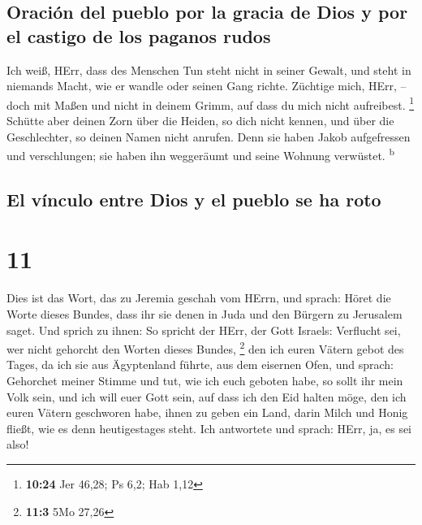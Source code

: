 \hypertarget{oraciuxf3n-del-pueblo-por-la-gracia-de-dios-y-por-el-castigo-de-los-paganos-rudos}{%
\subsection{Oración del pueblo por la gracia de Dios y por el castigo de
los paganos
rudos}\label{oraciuxf3n-del-pueblo-por-la-gracia-de-dios-y-por-el-castigo-de-los-paganos-rudos}}

 Ich weiß, HErr, dass des Menschen Tun steht nicht in
seiner Gewalt, und steht in niemands Macht, wie er wandle oder seinen
Gang richte.  Züchtige mich, HErr, -- doch mit Maßen und
nicht in deinem Grimm, auf dass du mich nicht aufreibest. \footnote{\textbf{10:24}
  Jer 46,28; Ps 6,2; Hab 1,12}  Schütte aber deinen Zorn
über die Heiden, so dich nicht kennen, und über die Geschlechter, so
deinen Namen nicht anrufen. Denn sie haben Jakob aufgefressen und
verschlungen; sie haben ihn weggeräumt und seine Wohnung verwüstet.
\textsuperscript{b}

\hypertarget{el-vuxednculo-entre-dios-y-el-pueblo-se-ha-roto}{%
\subsection{El vínculo entre Dios y el pueblo se ha
roto}\label{el-vuxednculo-entre-dios-y-el-pueblo-se-ha-roto}}

\hypertarget{section-10}{%
\section{11}\label{section-10}}

 Dies ist das Wort, das zu Jeremia geschah vom HErrn, und
sprach:  Höret die Worte dieses Bundes, dass ihr sie denen
in Juda und den Bürgern zu Jerusalem saget.  Und sprich zu
ihnen: So spricht der HErr, der Gott Israels: Verflucht sei, wer nicht
gehorcht den Worten dieses Bundes, \footnote{\textbf{11:3} 5Mo 27,26}
 den ich euren Vätern gebot des Tages, da ich sie aus
Ägyptenland führte, aus dem eisernen Ofen, und sprach: Gehorchet meiner
Stimme und tut, wie ich euch geboten habe, so sollt ihr mein Volk sein,
und ich will euer Gott sein,  auf dass ich den Eid halten
möge, den ich euren Vätern geschworen habe, ihnen zu geben ein Land,
darin Milch und Honig fließt, wie es denn heutigestages steht. Ich
antwortete und sprach: HErr, ja, es sei also!

